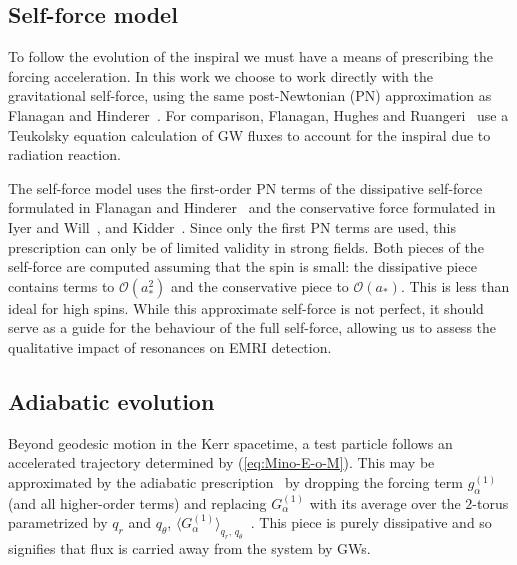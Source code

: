 \documentclass[aps,prd,amsfonts,amssymb,amsmath,nofootinbib,reprint,showpacs,superscriptaddress,twocolumn]{revtex4}
\newcommand{\eqnref}[1]{(\ref{eq:#1})}
\newcommand{\order}[1]{\ensuremath{\mathcal{O}({#1})}}
\begin{document}
\subsection{Self-force model}
\label{sec:self-force}

To follow the evolution of the inspiral we must have a means of prescribing the forcing acceleration. In this work we choose to work directly with the gravitational self-force, using the same post-Newtonian (PN) approximation as Flanagan and Hinderer~\cite{Flanagan2012}. For comparison, Flanagan, Hughes and Ruangeri~\cite{Flanagan2012a} use a Teukolsky equation calculation of GW fluxes to account for the inspiral due to radiation reaction.

The self-force model uses the first-order PN terms of the dissipative self-force formulated in Flanagan and Hinderer~\cite{Flanagan2007} and the conservative force formulated in Iyer and Will~\cite{Iyer1993}, and Kidder~\cite{Kidder1995}. Since only the first PN terms are used, this prescription can only be of limited validity in strong fields. Both pieces of the self-force are computed assuming that the spin is small: the dissipative piece contains terms to $\order{a_\ast^2}$ and the conservative piece to $\order{a_\ast}$. This is less than ideal for high spins. While this approximate self-force is not perfect, it should serve as a guide for the behaviour of the full self-force, allowing us to assess the qualitative impact of resonances on EMRI detection.

\subsection{Adiabatic evolution}
\label{sec:adiabatic}

Beyond geodesic motion in the Kerr spacetime, a test particle follows an accelerated trajectory determined by \eqnref{Mino-E-o-M}. This may be approximated by the adiabatic prescription~\cite{Hinderer2008} by dropping the forcing term $g_\alpha^{(1)}$ (and all higher-order terms) and replacing $G_\alpha^{(1)}$ with its average over the $2$-torus parametrized by $q_r$ and $q_\theta$, $\langle G_\alpha^{(1)}\rangle_{q_r,\,q_\theta}$~\cite{Drasco2005}. This piece is purely dissipative and so signifies that flux is carried away from the system by GWs.
\end{document}
